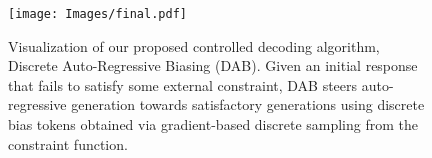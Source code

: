 \begin{figure}[th]
    \centering
    \texttt{[image: Images/final.pdf]}
    \caption{Visualization of our proposed controlled decoding algorithm, Discrete Auto-Regressive Biasing (DAB). Given an initial response that fails to satisfy some external constraint, DAB steers auto-regressive generation towards satisfactory generations using discrete bias tokens obtained via gradient-based discrete sampling from the constraint function.
}
\label{fig:intro_visualization}
\end{figure}